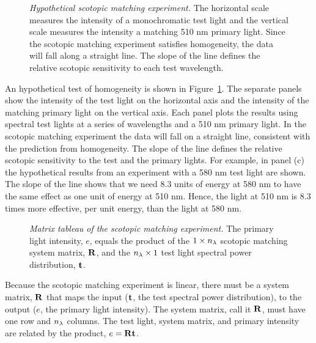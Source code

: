 \begin{figure}
\centerline {
}
\caption[Scotopic Color Matching Linearity]{
{\em Hypothetical scotopic matching experiment.}
The horizontal scale measures the intensity of a monochromatic
test light and the vertical scale measures the
intensity a matching 510 nm primary light.
Since the scotopic matching experiment satisfies homogeneity, the
data will fall along a straight line.
The slope of the line defines the
relative scotopic sensitivity to each test wavelength.
}
\label{f3:scotopic}
\end{figure}
An hypothetical test of homogeneity is shown
in Figure~\ref{f3:scotopic}.
The separate panels show the intensity of the test light
on the horizontal axis and the intensity
of the matching primary light on the vertical axis.
Each panel plots the results using
spectral test lights at a series of
wavelengths and  a 510 nm primary light.
In the scotopic matching experiment
the data will fall on a straight line, consistent with the
prediction from homogeneity.
The slope of the line defines the relative scotopic
sensitivity to the test and the primary lights.
For example, in panel (c) the hypothetical results from an experiment
with a 580 nm test light are shown.
The slope of the line shows
that we need $8.3$ units of energy
at 580 nm to have the same effect as one unit of
energy at 510 nm.
Hence, the light at 510 nm is $8.3$ times
more effective, per unit energy,
than the light at 580 nm.

\begin{figure}
\centerline {
}
\caption[Scotopic System Matrix]{
{\em Matrix tableau of the scotopic matching experiment.}
The primary light intensity, $e$,
equals the product of the $1 \times \mbox{$n_\lambda$}$
scotopic matching system matrix,
$\mbox{$\bf R$}$, and the $\mbox{$n_\lambda$} \times 1$ test light spectral
power distribution, $\mbox{${\bf t}$}$.
}
\label{f3:scotopic.mat}
\end{figure}
Because the scotopic matching experiment is linear,
there must be a system matrix, $\mbox{$\bf R$}$ that maps the
input ($\mbox{${\bf t}$}$, the test spectral power distribution),
to the output ($e$, the primary light intensity).
The system matrix, call it $\mbox{$\bf R$}$, must have one row and $\mbox{$n_\lambda$}$ columns.
The test light, system matrix, and primary intensity
are related by the
product, $e = \mbox{$\bf R$} \mbox{${\bf t}$}$.

